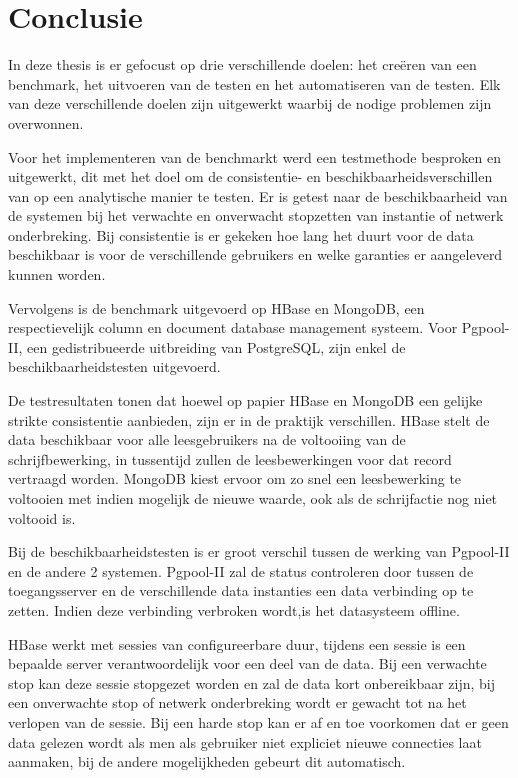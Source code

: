 \chapter{Conclusie}\label{sec:conclusie}
In deze thesis is er gefocust op drie verschillende doelen: het creëren van een benchmark, het uitvoeren van de testen en het automatiseren van de testen. Elk van deze verschillende doelen zijn uitgewerkt waarbij de nodige problemen zijn overwonnen. 

Voor het implementeren van de benchmarkt werd een testmethode besproken en uitgewerkt, dit met het doel om de consistentie- en beschikbaarheidsverschillen van op een analytische manier te testen. Er is getest naar de beschikbaarheid van de systemen bij het verwachte en onverwacht stopzetten van instantie of netwerk onderbreking. Bij consistentie is er gekeken hoe lang het duurt voor de data beschikbaar is voor de verschillende gebruikers en welke garanties er aangeleverd kunnen worden. 

Vervolgens is de benchmark uitgevoerd op  HBase en MongoDB, een respectievelijk column en document database management systeem. Voor Pgpool-II, een gedistribueerde uitbreiding van PostgreSQL, zijn enkel de beschikbaarheidstesten uitgevoerd. 

De testresultaten tonen dat hoewel op papier HBase en MongoDB een gelijke strikte consistentie aanbieden, zijn er in de praktijk verschillen. HBase stelt de data beschikbaar voor alle leesgebruikers na de voltooiing van de schrijfbewerking, in tussentijd zullen de leesbewerkingen voor dat record vertraagd worden. MongoDB kiest ervoor om zo snel een leesbewerking te voltooien met indien mogelijk de nieuwe waarde, ook als de schrijfactie nog niet voltooid is. 

Bij de beschikbaarheidstesten is er groot verschil tussen de werking van Pgpool-II en de andere 2 systemen. Pgpool-II zal de status controleren door tussen de toegangsserver en de verschillende data instanties een data verbinding op te zetten. Indien deze verbinding verbroken wordt,is het datasysteem offline. 

HBase werkt met sessies van configureerbare duur, tijdens een sessie is een bepaalde server verantwoordelijk voor een deel van de data. Bij een verwachte stop kan deze sessie stopgezet worden en zal de data kort onbereikbaar zijn, bij een onverwachte stop of netwerk onderbreking wordt er gewacht tot na het verlopen van de sessie. Bij een harde stop kan er af en toe voorkomen dat er geen data gelezen wordt als men als gebruiker niet expliciet nieuwe connecties laat aanmaken, bij de andere mogelijkheden gebeurt dit automatisch. 

